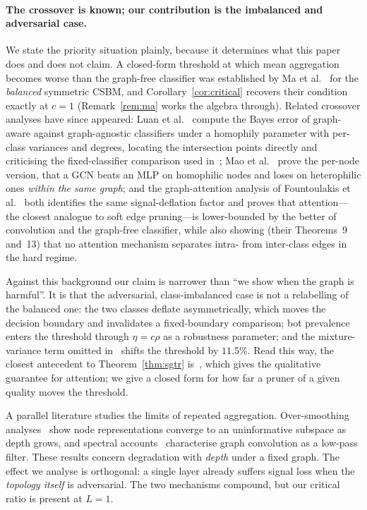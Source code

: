 \documentclass[../elsevier.tex]{subfiles}
\begin{document}
\paragraph{The crossover is known; our contribution is the imbalanced and
adversarial case.} We state the priority situation plainly, because it determines
what this paper does and does not claim. A closed-form threshold at which mean
aggregation becomes worse than the graph-free classifier was established by Ma
et al.~\citeyearpar[Thm.~2]{ma2022homophily} for the \emph{balanced} symmetric CSBM, and
Corollary~\ref{cor:critical} recovers their condition exactly at $c = 1$
(Remark~\ref{rem:ma} works the algebra through). Related crossover analyses have
since appeared: Luan et al.~\citeyearpar{luan2023when} compute the Bayes error of
graph-aware against graph-agnostic classifiers under a homophily parameter with
per-class variances and degrees, locating the intersection points directly and
criticising the fixed-classifier comparison used in~\citep{ma2022homophily}; Mao
et al.~\citeyearpar{mao2023demystifying} prove the per-node version, that a GCN beats an
MLP on homophilic nodes and loses on heterophilic ones \emph{within the same graph};
and the graph-attention analysis of Fountoulakis
et al.~\citeyearpar{fountoulakis2023graph} both identifies the same signal-deflation
factor and proves that attention---the closest analogue to soft edge
pruning---is lower-bounded by the better of convolution and the graph-free
classifier, while also showing (their Theorems~9 and~13) that no attention
mechanism separates intra- from inter-class edges in the hard regime.

Against this background our claim is narrower than ``we show when the graph is
harmful''. It is that the adversarial, class-imbalanced case is not a relabelling of
the balanced one: the two classes deflate asymmetrically, which moves the decision
boundary and invalidates a fixed-boundary comparison; bot prevalence enters the
threshold through $\eta = c\rho$ as a robustness parameter; and the mixture-variance
term omitted in~\citep{ma2022homophily} shifts the threshold by $11.5\%$. Read this way,
the closest antecedent to Theorem~\ref{thm:sgtr} is~\citep{fountoulakis2023graph},
which gives the qualitative guarantee for attention; we give a closed form for how
far a pruner of a given quality moves the threshold.

A parallel literature studies the limits of repeated aggregation. Over-smoothing
analyses~\citep{li2018deeper,oono2020graph} show node representations converge to
an uninformative subspace as depth grows, and spectral
accounts~\citep{nt2019revisiting} characterise graph convolution as a low-pass
filter. These results concern degradation with \emph{depth} under a fixed graph.
The effect we analyse is orthogonal: a single layer already suffers signal loss
when the \emph{topology itself} is adversarial. The two mechanisms compound, but
our critical ratio is present at $L = 1$.
\end{document}

